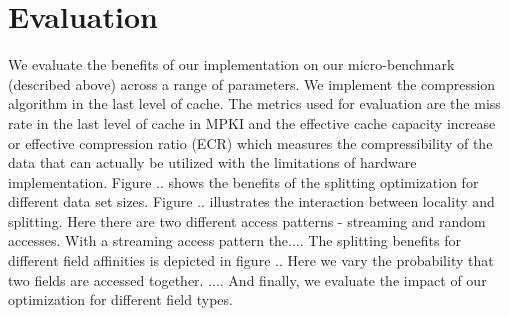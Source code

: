 \section{Evaluation}
\label{sec:eval}
We evaluate the benefits of our implementation on our micro-benchmark (described above) across a range of parameters. We implement the compression algorithm in the last level of cache. The metrics used for evaluation are the miss rate in the last level of cache in MPKI and the effective cache capacity increase or effective compression ratio (ECR) which measures the compressibility of the data that can actually be utilized with the limitations of hardware implementation. Figure .. shows the benefits of the splitting optimization for different data set sizes. Figure .. illustrates the interaction between locality and splitting. Here there are two different access patterns - streaming and random accesses. With a streaming access pattern the.... The splitting benefits for different field affinities is depicted in figure .. Here we vary the probability that two fields are accessed together. .... And finally, we evaluate the impact of our optimization for different field types.  

